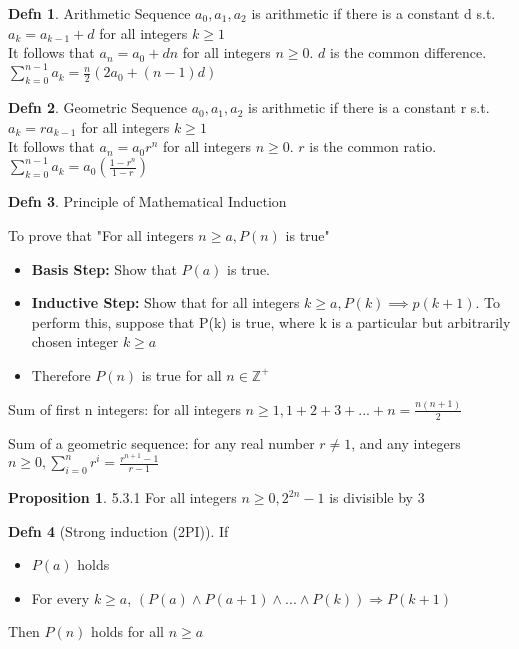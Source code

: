 \documentclass[a4paper]{article}
\theoremstyle{definition}
\newtheorem*{defn}{Defn}
\newtheorem*{propos}{Proposition}
\newenvironment{theorem}[1]
  {\renewcommand\theinnertheorem{#1}\innertheorem}
  {\endinnertheorem}
\begin{document}
\begin{defn} Arithmetic Sequence
  $a_0, a_1,a_2$ is arithmetic if there is a constant d s.t. $a_k = a_{k-1}+d$ for all integers $k \geq 1$\\ 
  It follows that $a_n = a_0 + dn$ for all integers $n \geq 0$. $d$ is the common difference. $\sum^{n-1}_{k=0}a_k = \frac{n}{2}(2a_0 + (n-1)d)$
\end{defn}
\begin{defn} Geometric Sequence
  $a_0, a_1,a_2$ is arithmetic if there is a constant r s.t. $a_k = ra_{k-1}$ for all integers $k \geq 1$\\ 
  It follows that $a_n = a_0 r^n$ for all integers $n \geq 0$. $r$ is the common ratio. $\sum^{n-1}_{k=0}a_k = a_0(\frac{1-r^n}{1-r})$
\end{defn}

\begin{defn} Principle of Mathematical Induction

  To prove that "For all integers $n \geq a, P(n)$ is true"
  \begin{itemize}
    \item \textbf{Basis Step:} Show that $P(a)$ is true.
    \item \textbf{Inductive Step: } Show that for all integers $k \geq a, P(k) \implies p(k+1)$. To perform this, suppose that P(k) is true, where k is a particular but arbitrarily chosen integer $k \geq a$
    \item Therefore $P(n)$ is true for all $n \in \mathbb{Z}^+$
  \end{itemize}
\end{defn}

\begin{theorem}{5.2.2} Sum of first n integers: for all integers $n \geq 1, 1 + 2 + 3 + ... + n = \frac{n(n+1)}{2}$ \end{theorem}

\begin{theorem}{5.2.3} Sum of a geometric sequence: for any real number $r \not = 1$, and any integers $n \geq 0, \sum^{n}_{i=0} r^i = \frac{r^{n+1}-1}{r-1}$ \end{theorem}

\begin{propos}{5.3.1} For all integers $n \geq 0, 2^{2n}-1$ is divisible by 3 \end{propos}

\begin{defn}[Strong induction (2PI)] If
  \begin{itemize}
    \item $P(a)$ holds
    \item For every $k \geq a$, $(P(a) \land P(a+1) \land ... \land P(k)) \Rightarrow P(k+1)$
  \end{itemize}
  Then $P(n)$ holds for all $n \geq a$
\end{defn}
\end{document}
